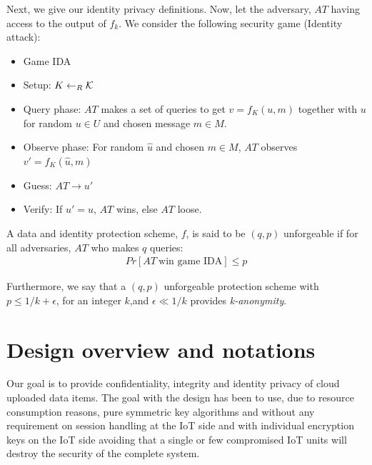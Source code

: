 {\begin{definition}
\end{definition}
Next, we give our identity privacy definitions. Now, let the adversary, $AT$ having access to the output of $f_{k}$. We consider the following security game (Identity attack):
\begin{itemize}
    \item[] Game IDA \\
    \item Setup: $K \leftarrow_R \cal{K}$
    \item Query phase: $AT$ makes a set of queries to get $v = f_K(u,m)$ together with $u$ for random $u \in U$ and chosen message $m \in M$.
    \item Observe phase: For random $\hat{u}$ and chosen $m \in M$, $AT$ observes  $v' = f_K(\hat{u},m)$
    \item Guess: $AT \rightarrow u'$
    \item Verify: If $u' =  \hat{u}$, $AT$ wins, else $AT$ loose.
\end{itemize}
\begin{definition}
\label{idprivacy}
A data and identity protection scheme, $f$, is said to be $(q,p)$ unforgeable if for all adversaries, $AT$ who makes $q$ queries: 
\begin{eqnarray}
     Pr[AT\: \text{win  game IDA}] \leq p \label{req:privacy}
\end{eqnarray}
\end{definition}
Furthermore, we say that a $(q,p)$ unforgeable protection scheme with $p \leq 1/k + \epsilon$, for an integer $k$,and $\epsilon \ll 1/k$ provides \textit{k-anonymity}. 

\graphicspath{{DesignOverview/images/}}
\section{Design overview and notations}
\label{design}
Our goal is to provide confidentiality, integrity and identity privacy of cloud uploaded data items. The goal with the design has been to use, due to resource consumption reasons, pure symmetric key algorithms and without any requirement on session handling at the IoT side and with individual encryption keys on the IoT side avoiding that a single or few compromised IoT units will destroy the security of the complete system.

}

